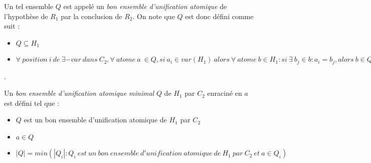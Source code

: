 	Un tel ensemble $Q$ est appel\'e un {\em bon ensemble d'unification atomique} de l'hypoth\`ese de $R_{1}$ par la conclusion de $R_{2}$.
	On note que $Q$ est donc d\'efini comme suit :
	\begin{itemize}
		\item $Q \subseteq H_{1}$
		\item $\forall\ position\ i\ de\ \exists-var\ dans\ C_{2}, \forall\ atome\ a\ \in Q, si\ a_i \in var(H_{1})\ alors\ \forall\ atome\ b \in H_{1} : si\ \exists\ b_j \in b : a_i = b_j, alors\ b \in Q$
	\end{itemize}
.

	Un {\em bon ensemble d'unification atomique minimal} $Q$ de $H_{1}$ par $C_{2}$ enracin\'e en $a$ est d\'efini tel que :
	\begin{itemize}
		\item $Q$ est un bon ensemble d'unification atomique de $H_{1}$ par $C_{2}$
		\item $a \in Q$
		\item $|Q| = min(|Q_i| : Q_i\ est\ un\ bon\ ensemble\ d'unification\ atomique\ de\ H_1\ par\ C_2\ et\ a \in Q_i)$
	\end{itemize}


